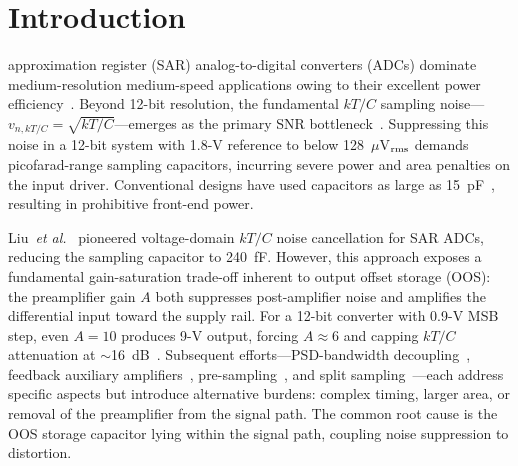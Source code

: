 \documentclass[journal]{IEEEtran}
\begin{document}
\section{Introduction}
 approximation register (SAR) analog-to-digital converters (ADCs) dominate medium-resolution medium-speed applications owing to their excellent power efficiency~\cite{liu12Bit10MS2016}. Beyond 12-bit resolution, the fundamental $kT/C$ sampling noise---$v_{n,kT/C}=\sqrt{kT/C}$---emerges as the primary SNR bottleneck~\cite{kapustaSamplingCircuitsThat2014}. Suppressing this noise in a 12-bit system with 1.8-V reference to below 128~$\mu$V$_{\rm rms}$ demands picofarad-range sampling capacitors, incurring severe power and area penalties on the input driver. Conventional designs have used capacitors as large as 15~pF~\cite{liu12Bit10MS2016}, resulting in prohibitive front-end power.

Liu~\textit{et al.}~\cite{liu13bit0005mm240MS2020} pioneered voltage-domain $kT/C$ noise cancellation for SAR ADCs, reducing the sampling capacitor to 240~fF. However, this approach exposes a fundamental gain-saturation trade-off inherent to output offset storage (OOS): the preamplifier gain $A$ both suppresses post-amplifier noise and amplifies the differential input toward the supply rail. For a 12-bit converter with 0.9-V MSB step, even $A=10$ produces 9-V output, forcing $A\approx6$ and capping $kT/C$ attenuation at $\sim$16~dB~\cite{liu13bit0005mm240MS2020}. Subsequent efforts---PSD-bandwidth decoupling~\cite{li2020_SAR}, feedback auxiliary amplifiers~\cite{won2024_13b}, pre-sampling~\cite{guImprovedKTNoise2024}, and split sampling~\cite{huang5MS16bitLownoise2025}---each address specific aspects but introduce alternative burdens: complex timing, larger area, or removal of the preamplifier from the signal path. The common root cause is the OOS storage capacitor lying within the signal path, coupling noise suppression to distortion.
\end{document}
